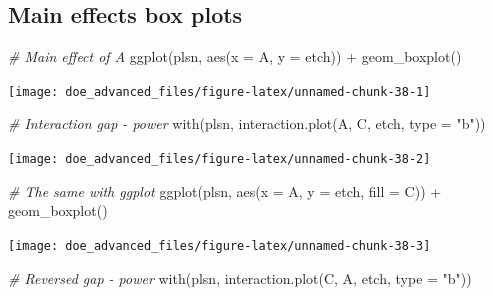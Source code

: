 \documentclass[
]{book}
\newenvironment{Shaded}{\begin{snugshade}}{\end{snugshade}}
\newcommand{\AttributeTok}[1]{\textcolor[rgb]{0.77,0.63,0.00}{#1}}
\newcommand{\CommentTok}[1]{\textcolor[rgb]{0.56,0.35,0.01}{\textit{#1}}}
\newcommand{\FunctionTok}[1]{\textcolor[rgb]{0.00,0.00,0.00}{#1}}
\newcommand{\NormalTok}[1]{#1}
\newcommand{\SpecialCharTok}[1]{\textcolor[rgb]{0.00,0.00,0.00}{#1}}
\newcommand{\StringTok}[1]{\textcolor[rgb]{0.31,0.60,0.02}{#1}}
\begin{document}
\hypertarget{main-effects-box-plots}{%
\subsection{Main effects box plots}\label{main-effects-box-plots}}

\begin{Shaded}
\begin{Highlighting}[]
\CommentTok{\# Main effect of A}
\FunctionTok{ggplot}\NormalTok{(plsn, }\FunctionTok{aes}\NormalTok{(}\AttributeTok{x =}\NormalTok{ A, }\AttributeTok{y =}\NormalTok{ etch)) }\SpecialCharTok{+}
  \FunctionTok{geom\_boxplot}\NormalTok{()}
\end{Highlighting}
\end{Shaded}

\texttt{[image: doe\_advanced\_files/figure-latex/unnamed-chunk-38-1]}

\begin{Shaded}
\begin{Highlighting}[]
\CommentTok{\# Interaction gap {-} power}
\FunctionTok{with}\NormalTok{(plsn, }\FunctionTok{interaction.plot}\NormalTok{(A, C, etch, }\AttributeTok{type =} \StringTok{"b"}\NormalTok{))}
\end{Highlighting}
\end{Shaded}

\texttt{[image: doe\_advanced\_files/figure-latex/unnamed-chunk-38-2]}

\begin{Shaded}
\begin{Highlighting}[]
\CommentTok{\# The same with ggplot}
\FunctionTok{ggplot}\NormalTok{(plsn, }\FunctionTok{aes}\NormalTok{(}\AttributeTok{x =}\NormalTok{ A, }\AttributeTok{y =}\NormalTok{ etch, }\AttributeTok{fill =}\NormalTok{ C)) }\SpecialCharTok{+}
  \FunctionTok{geom\_boxplot}\NormalTok{()}
\end{Highlighting}
\end{Shaded}

\texttt{[image: doe\_advanced\_files/figure-latex/unnamed-chunk-38-3]}

\begin{Shaded}
\begin{Highlighting}[]
\CommentTok{\# Reversed gap {-} power}
\FunctionTok{with}\NormalTok{(plsn, }\FunctionTok{interaction.plot}\NormalTok{(C, A, etch, }\AttributeTok{type =} \StringTok{"b"}\NormalTok{))}
\end{Highlighting}
\end{Shaded}
\end{document}
